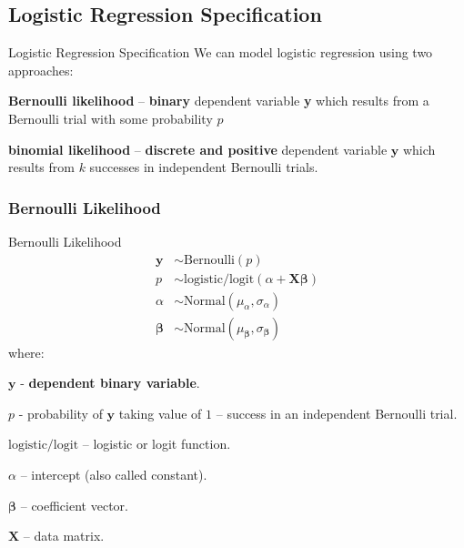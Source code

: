 \subsection{Logistic Regression Specification}
\begin{frame}{Logistic Regression Specification}
	We can model logistic regression using two approaches:
	\begin{vfilleditems}
		\item \textbf{Bernoulli likelihood} --
		\textbf{binary} dependent variable \textbf{y} which results from a
		Bernoulli trial with some probability $p$
		\item \textbf{binomial likelihood} --
		\textbf{discrete and positive} dependent variable $\textbf{y}$
		which results from $k$ successes in independent Bernoulli
		trials.
	\end{vfilleditems}
\end{frame}

\subsubsection{Bernoulli Likelihood}
\begin{frame}{Bernoulli Likelihood}
	\small
	$$
		\begin{aligned}
			\mathbf{y}     & \sim \text{Bernoulli}\left( p\right)                                      \\
			p                  & \sim \text{logistic/logit}(\alpha +  \mathbf{X} \boldsymbol{\beta})       \\
			\alpha             & \sim \text{Normal}(\mu_\alpha, \sigma_\alpha)                             \\
			\boldsymbol{\beta} & \sim \text{Normal}(\mu_{\boldsymbol{\beta}}, \sigma_{\boldsymbol{\beta}})
		\end{aligned}
	$$
	where:
	\begin{vfilleditems}
		\item \small $\mathbf{y}$ - \textbf{dependent binary variable}.
		\item \small $p$ - probability of $\mathbf{y}$ taking value of $1$ --
		success in an independent Bernoulli trial.
		\item \small $\text{logistic/logit}$ -- logistic or logit function.
		\item \small $\alpha$ -- intercept (also called constant).
		\item \small $\boldsymbol{\beta}$ -- coefficient vector.
		\item \small $\mathbf{X}$ -- data matrix.
	\end{vfilleditems}
\end{frame}

